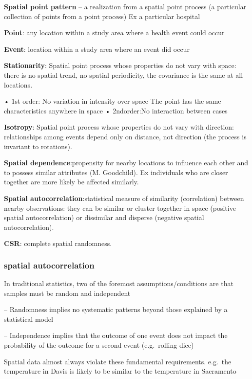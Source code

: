 \documentclass[
]{article}
\begin{document}
\textbf{Spatial point pattern} -- a realization from a spatial point
process (a particular collection of points from a point process) Ex a
particular hospital

\textbf{Point}: any location within a study area where a health event
could occur

\textbf{Event}: location within a study area where an event did occur

\textbf{Stationarity}: Spatial point process whose properties do not
vary with space: there is no spatial trend, no spatial periodicity, the
covariance is the same at all locations.

• 1st order: No variation in intensity over space The point has the same
characteristics anywhere in space • 2ndorder:No interaction between
cases

\textbf{Isotropy}: Spatial point process whose properties do not vary
with direction: relationships among events depend only on distance, not
direction (the process is invariant to rotations).

\textbf{Spatial dependence}:propensity for nearby locations to influence
each other and to possess similar attributes (M. Goodchild). Ex
individuals who are closer together are more likely be affected
similarly.

\textbf{Spatial autocorrelation}:statistical measure of similarity
(correlation) between nearby observations: they can be similar or
cluster together in space (positive spatial autocorrelation) or
dissimilar and disperse (negative spatial autocorrelation).

\textbf{CSR}: complete spatial randomness.

\hypertarget{spatial-autocorrelation}{%
\subsubsection{spatial autocorrelation}\label{spatial-autocorrelation}}

In traditional statistics, two of the foremost assumptions/conditions
are that samples must be random and independent

-- Randomness implies no systematic patterns beyond those explained by a
statistical model

-- Independence implies that the outcome of one event does not impact
the probability of the outcome for a second event (e.g.~rolling dice)

Spatial data almost always violate these fundamental requirements.
e.g.~the temperature in Davis is likely to be similar to the temperature
in Sacramento
\end{document}
